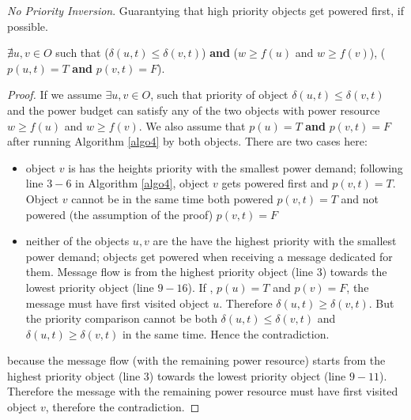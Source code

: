 \documentclass[../main/IoT.tex]{subfiles}
\begin{document}
\begin{theorem}
\emph{No Priority Inversion}. Guarantying that high priority objects get powered first, if possible.
\end{theorem}
\begin{lemma}\label{lemma2}
      $\nexists u,v \in O$ such that ($\delta(u,t) \le \delta(v,t)$) \textbf{and} ($w\geq f(u)$ and $w\geq f(v)$), ($ p(u,t)=T$ \textbf{and} $p(v,t)=F$).
\end{lemma}

\begin{proof}
    If we assume $\exists u, v \in O$, such that priority of object $\delta(u,t) \le \delta(v,t)$ and the power budget can satisfy any of the two objects with power resource $w\geq f(u)$ and $w\geq f(v)$. We also assume that $p(u) = T$ \textbf{and} $p(v,t) = F$ after running Algorithm \ref{algo4} by both objects. There are two cases here:
    \begin{itemize}
      \item object $v$ is has the heights priority with the smallest power demand; following line $3-6$ in Algorithm \ref{algo4}, object $v$ gets powered first and $p(v,t) = T$. Object $v$ cannot be in the same time both powered $p(v,t) = T$ and not powered (the assumption of the proof) $p(v,t) = F$
      \item neither of the objects $u,v$ are the have the highest priority with the smallest power demand; objects get powered when receiving a message dedicated for them. Message flow is from the highest priority object (line $3$) towards the lowest priority object (line $9-16$). If , $p(u) = T$ and $p(v) = F$, the message must have first visited object $u$. Therefore $\delta(u,t) \ge \delta(v,t)$. But the priority comparison cannot be both $\delta(u,t) \le \delta(v,t)$ and $\delta(u,t) \geq \delta(v,t)$ in the same time. Hence the contradiction.
    \end{itemize}
    because the message flow (with the remaining power resource) starts from the highest priority object (line $3$) towards the lowest priority object (line $9-11$). Therefore the message with the remaining power resource must have first visited object $v$, therefore the contradiction.
\end{proof}
\end{document}
